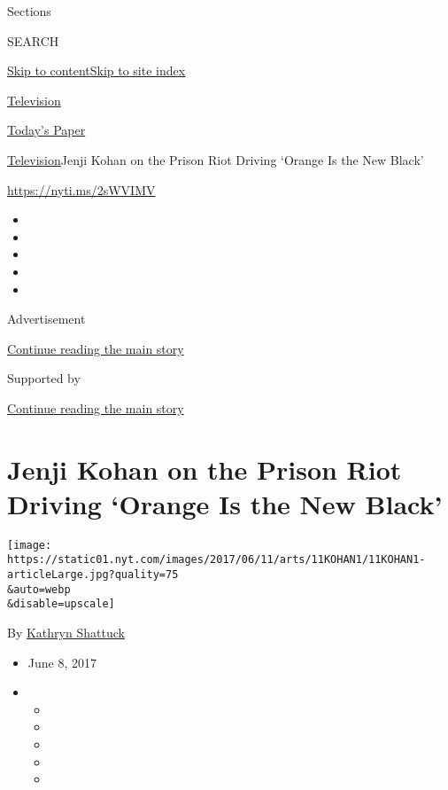 Sections

SEARCH

\protect\hyperlink{site-content}{Skip to
content}\protect\hyperlink{site-index}{Skip to site index}

\href{https://www.nytimes.com/section/arts/television}{Television}

\href{https://myaccount.nytimes.com/auth/login?response_type=cookie\&client_id=vi}{}

\href{https://www.nytimes.com/section/todayspaper}{Today's Paper}

\href{/section/arts/television}{Television}\textbar{}Jenji Kohan on the
Prison Riot Driving `Orange Is the New Black'

\href{https://nyti.ms/2sWVIMV}{https://nyti.ms/2sWVIMV}

\begin{itemize}
\item
\item
\item
\item
\item
\end{itemize}

Advertisement

\protect\hyperlink{after-top}{Continue reading the main story}

Supported by

\protect\hyperlink{after-sponsor}{Continue reading the main story}

\hypertarget{jenji-kohan-on-the-prison-riot-driving-orange-is-the-new-black}{%
\section{Jenji Kohan on the Prison Riot Driving `Orange Is the New
Black'}\label{jenji-kohan-on-the-prison-riot-driving-orange-is-the-new-black}}

\texttt{[image: https://static01.nyt.com/images/2017/06/11/arts/11KOHAN1/11KOHAN1-articleLarge.jpg?quality=75\\\&auto=webp\\\&disable=upscale]}

By \href{https://www.nytimes.com/by/kathryn-shattuck}{Kathryn Shattuck}

\begin{itemize}
\item
  June 8, 2017
\item
  \begin{itemize}
  \item
  \item
  \item
  \item
  \item
  \end{itemize}
\end{itemize}


